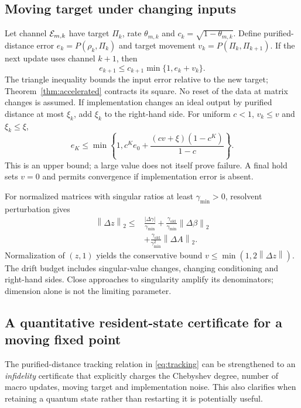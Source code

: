 \documentclass{ieeeaccess}
\newcommand{\norm}[1]{\left\lVert #1\right\rVert}
\begin{document}
\subsection{Moving target under changing inputs}
Let channel $\mathcal E_{m,k}$ have target $\Pi_k$, rate $\theta_{m,k}$ and $c_k=\sqrt{1-\theta_{m,k}}$. Define purified-distance error $e_k=P(\rho_k,\Pi_k)$ and target movement $v_k=P(\Pi_k,\Pi_{k+1})$. If the next update uses channel $k+1$, then
\begin{equation}\label{eq:tracking}
e_{k+1}\le c_{k+1}\min\{1,e_k+v_k\}.
\end{equation}
The triangle inequality bounds the input error relative to the new target; Theorem~\ref{thm:accelerated} contracts its square. No reset of the data at matrix changes is assumed. If implementation changes an ideal output by purified distance at most $\xi_k$, add $\xi_k$ to the right-hand side. For uniform $c<1$, $v_k\le v$ and $\xi_k\le\xi$,
\begin{equation}\label{eq:uniformtrack}
e_K\le\min\left\{1,c^Ke_0+\frac{(cv+\xi)(1-c^K)}{1-c}\right\}.
\end{equation}
This is an upper bound; a large value does not itself prove failure. A final hold sets $v=0$ and permits convergence if implementation error is absent.

For normalized matrices with singular ratios at least $\gamma_{\min}>0$, resolvent perturbation gives
\begin{align}\label{eq:inputdrift}
\norm{\Delta z}_2\le{}&\frac{|\Delta\gamma|}{\gamma_{\min}}+
\frac{\gamma_{\mathrm{old}}}{\gamma_{\min}}\norm{\Delta\beta}_2\nonumber\\
&+\frac{\gamma_{\mathrm{old}}}{\gamma_{\min}^2}\norm{\Delta A}_2.
\end{align}
Normalization of $(z,1)$ yields the conservative bound $v\le\min(1,2\norm{\Delta z})$. The drift budget includes singular-value changes, changing conditioning and right-hand sides. Close approaches to singularity amplify its denominators; dimension alone is not the limiting parameter.

\subsection{A quantitative resident-state certificate for a moving fixed point}
\label{sec:residentcertificate}
The purified-distance tracking relation in \eqref{eq:tracking} can be
strengthened to an \emph{infidelity} certificate that explicitly charges
the Chebyshev degree, number of macro updates, moving target and
implementation noise. This also clarifies when retaining a quantum state
rather than restarting it is potentially useful.
\end{document}
